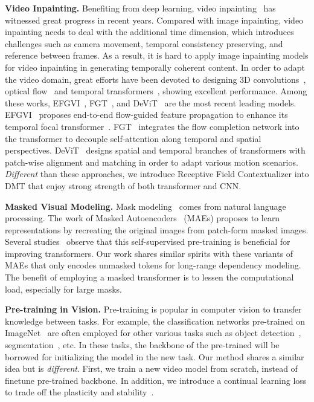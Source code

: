 \documentclass[10pt,twocolumn,letterpaper]{article}
\begin{document}
\vspace{0.5em}
\noindent
\textbf{Video Inpainting.} Benefiting from deep learning, video inpainting~\cite{kim19deep} has witnessed great progress in recent years. Compared with image inpainting, video inpainting needs to deal with the additional time dimension, which introduces challenges such as camera movement, temporal consistency preserving, and reference between frames. As a result, it is hard to apply image inpainting models for video inpainting in generating temporally coherent content. In order to adapt the video domain, great efforts have been devoted to designing 3D convolutions~\cite{chang19free,wang19video}, optical flow~\cite{xu19dfc,zhang22inertia,kang22error,zhang22flow} and temporal transformers~\cite{zeng20sttn,liu21fuseformer,zhang22flow,li22e2fgvi,cai22devit}, showing excellent performance. Among these works, EFGVI~\cite{li22e2fgvi}, FGT~\cite{zhang22flow}, and DeViT~\cite{cai22devit} are the most recent leading models. 
EFGVI~\cite{li22e2fgvi} proposes end-to-end flow-guided feature propagation to enhance its temporal focal transformer~\cite{yang21focal}. FGT~\cite{zhang22flow} integrates the flow completion network into the transformer to decouple self-attention along temporal and spatial perspectives. DeViT~\cite{cai22devit} designs spatial and temporal branches of transformers with patch-wise alignment and matching in order to adapt various motion scenarios. \emph{Different} than these approaches, we introduce Receptive Field Contextualizer into DMT that enjoy strong strength of both transformer and CNN.

\vspace{0.5em}
\noindent
\textbf{Masked Visual Modeling.} Mask modeling~\cite{devlin19bert} comes from natural language processing. The work of Masked Autoencoders~\cite{he22mae} (MAEs) proposes to learn representations by recreating the original images from patch-form masked images. Several studies~\cite{DBLP:journals/corr/abs-2204-01678,DBLP:journals/corr/abs-2208-10442,DBLP:conf/iclr/Bao0PW22} observe that this self-supervised pre-training is beneficial for improving transformers. Our work shares similar spirits with these variants of MAEs that only encodes unmasked tokens for long-range dependency modeling. The benefit of employing a masked transformer is to lessen the computational load, especially for large masks. 

\vspace{0.5em}
\noindent
\textbf{Pre-training in Vision.} Pre-training is popular in computer vision to transfer knowledge between tasks. For example, the classification networks pre-trained on ImageNet~\cite{deng2009imagenet} are often employed for other various tasks such as object  detection~\cite{ren2015faster}, segmentation~\cite{long2015fully}, etc. In these tasks, the backbone of the pre-trained will be borrowed for initializing the model in the new task. Our method shares a similar idea but is \emph{different}. First, we train a new video model from scratch, instead of finetune pre-trained backbone. In addition, we introduce a continual learning loss to trade off the plasticity and stability~\cite{mermillod2013stability}.  
\end{document}
